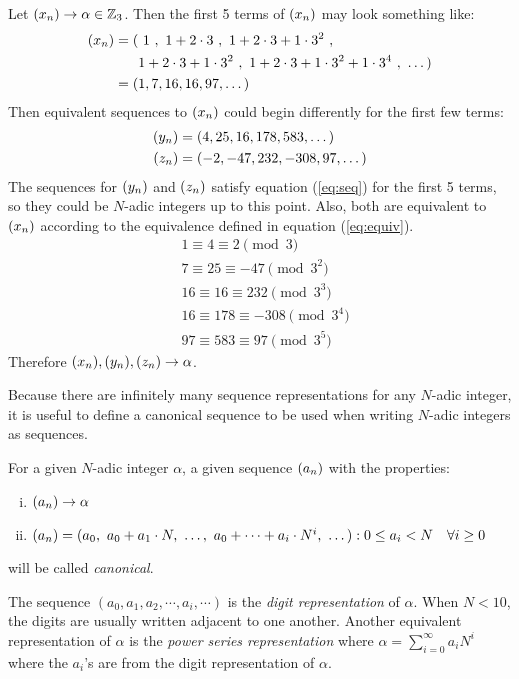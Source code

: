 \begin{example} \label{ex:equiv-seq}
  Let $(x_n) \rightarrow \alpha \in \mathbb{Z}_3$. Then the first 5 terms of
  $(x_n)$ may look something like:
  \begin{align*}
    (x_n) = (&\ 1\ , \ 1+2\cdot3 \ , \ 1+2\cdot3+1\cdot3^2 \ ,\\
            &1+2\cdot3+1\cdot3^2 \ , \ 1+2\cdot3+1\cdot3^2+1\cdot3^4 \ ,
              \ \dots)\\
        = (&1,7,16,16,97,\dots)
  \end{align*}
  Then equivalent sequences to $(x_n)$ could begin differently for the first
  few terms:
  \begin{align*}
    (y_n) &= (4,25,16,178,583,\dots) \\
    (z_n) &= (-2,-47,232,-308,97,\dots)
  \end{align*}
  The sequences for $(y_n)$ and $(z_n)$ satisfy equation (\ref{eq:seq}) for the
  first 5 terms, so they could be $N$-adic integers up to this point. Also,
  both are equivalent to $(x_n)$ according to the equivalence defined in
  equation (\ref{eq:equiv}).
  \begin{align*}
    &1 \equiv 4 \equiv 2 \pmod 3 \\
    &7 \equiv 25 \equiv -47 \pmod{3^2} \\
    &16 \equiv 16 \equiv 232 \pmod{3^3} \\
    &16 \equiv 178 \equiv -308 \pmod{3^4} \\
    &97 \equiv 583 \equiv 97 \pmod{3^5}
  \end{align*}
  Therefore $(x_n),(y_n),(z_n) \rightarrow \alpha$.
\end{example}

\par Because there are infinitely many sequence representations for any
$N$-adic integer, it is useful to define a canonical sequence to be used
when writing $N$-adic integers as sequences.
  
\begin{definition}
\label{def:canon}
  \par For a given $N$-adic integer $\alpha$, a given sequence $(a_n)$ with
  the properties:
  \begin{enumerate}[i.]
    \item $(a_n) \rightarrow \alpha$
    \item $\an=(a_0, \ a_0+a_1\cdot N, \ \dots, \ a_0+\dots+a_i\cdot N^i, \ \dots) : 0 \leq a_i < N \ \ \ \forall i \geq 0$
  \end{enumerate}
  will be called {\em canonical}.
	\par The sequence $(a_0,a_1,a_2,\cdots,a_i,\cdots)$ is the {\em digit
	representation} of $\alpha$. When $N<10$, the digits are usually
	written adjacent to one another. Another equivalent representation of $\alpha$
  is the {\it power series representation} where $\alpha=\sum_{i=0}^\infty
	a_iN^i$ where the $a_i$'s are from the digit representation of $\alpha$.
\end{definition}

